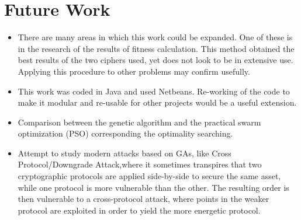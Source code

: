 \section{Future Work}
\begin{itemize}
    \item {There are many areas in which this work could be expanded. One of these is in the research of the results of fitness calculation. This method obtained the best results of the two ciphers used, yet does not look to be in extensive use. Applying this procedure to other problems may confirm usefully.}
    \item {This work was coded in Java and used Netbeans. Re-working of the code to make it modular and re-usable for other projects would be a useful extension. }
    \item {Comparison between the genetic algorithm and the practical swarm optimization (PSO) corresponding the optimality searching.}
    \item {Attempt to study modern attacks based on GAs, like Cross Protocol/Downgrade Attack,where it sometimes transpires that two cryptographic protocols are applied side-by-side to secure the same asset, while one protocol is more vulnerable than the other.  The resulting order is then vulnerable to a cross-protocol attack, where points in the weaker protocol are exploited in order to yield the more energetic protocol.}
\end{itemize}

